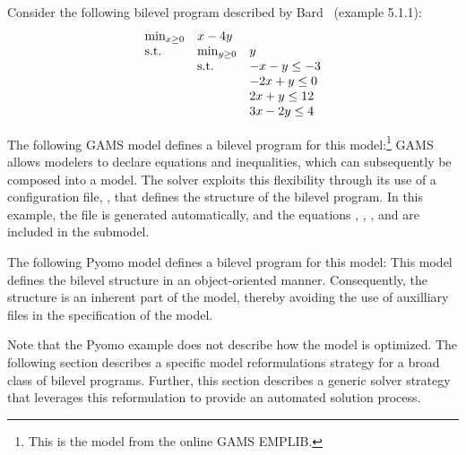 Consider the following bilevel program described by Bard~\cite{Bard98} (example 5.1.1):
\begin{equation*}
\begin{array}{lll}
\min_{x \geq 0} & x - 4 y & \\
\textrm{s.t.} & \min_{y \geq 0} & y\\
 & \textrm{s.t.} & -x -y \leq -3\\
& & -2 x + y \leq 0\\
& & 2 x + y \leq 12\\
& & 3 x - 2 y \leq 4
\end{array}
\end{equation*}

The following GAMS model defines a bilevel program for this
model:\footnote{ This is the  model from the
online GAMS EMPLIB.}
GAMS allows modelers to declare equations and inequalities, which
can subsequently be composed into a model.  The  solver
exploits this flexibility through its use of a configuration file,
, that defines the structure of the bilevel program.
In this example, the  file is generated automatically, and the equations
, , ,  and  are included in the
submodel.
\fi

The following Pyomo model defines a bilevel program for this model:
This model defines the bilevel structure in an object-oriented
manner.  Consequently, the structure is an inherent part of the
model, thereby avoiding the use of auxilliary files in the specification of
the model.

Note that the Pyomo example does not describe how the model is
optimized.  The following section describes a specific model
reformulations strategy for a broad class of bilevel programs.
Further, this section describes a generic solver strategy that leverages
this reformulation to provide an automated solution process.
\fi


\label{sec:BLP}

